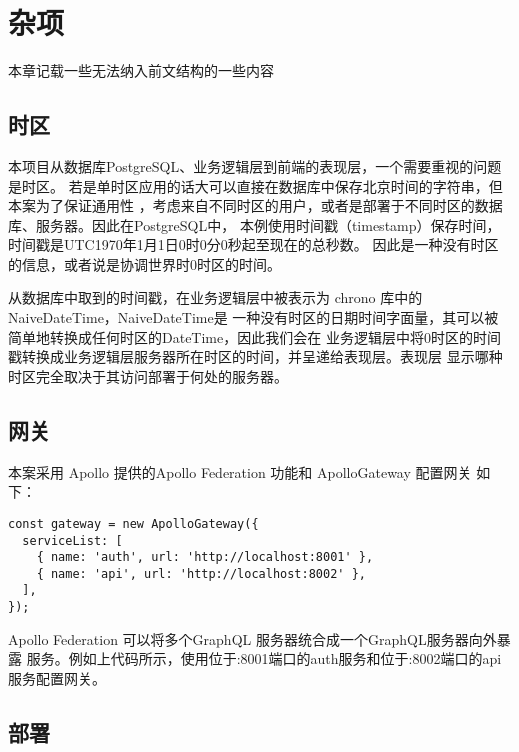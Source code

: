 \section{杂项}
本章记载一些无法纳入前文结构的一些内容
\subsection{时区}
本项目从数据库PostgreSQL、业务逻辑层到前端的表现层，一个需要重视的问题是时区。
若是单时区应用的话大可以直接在数据库中保存北京时间的字符串，但本案为了保证通用性
，考虑来自不同时区的用户，或者是部署于不同时区的数据库、服务器。因此在PostgreSQL中，
本例使用时间戳（timestamp）保存时间，时间戳是UTC1970年1月1日0时0分0秒起至现在的总秒数。
因此是一种没有时区的信息，或者说是协调世界时0时区的时间。

从数据库中取到的时间戳，在业务逻辑层中被表示为 chrono 库中的 NaiveDateTime，NaiveDateTime是
一种没有时区的日期时间字面量，其可以被简单地转换成任何时区的DateTime，因此我们会在
业务逻辑层中将0时区的时间戳转换成业务逻辑层服务器所在时区的时间，并呈递给表现层。表现层
显示哪种时区完全取决于其访问部署于何处的服务器。

\subsection{网关}
本案采用 Apollo 提供的Apollo Federation 功能和 ApolloGateway 配置网关
如下：

\begin{lstlisting}
const gateway = new ApolloGateway({
  serviceList: [
    { name: 'auth', url: 'http://localhost:8001' },
    { name: 'api', url: 'http://localhost:8002' },
  ],
});
\end{lstlisting}

Apollo Federation 可以将多个GraphQL 服务器统合成一个GraphQL服务器向外暴露
服务。例如上代码所示，使用位于:8001端口的auth服务和位于:8002端口的api服务配置网关。

\subsection{部署}
